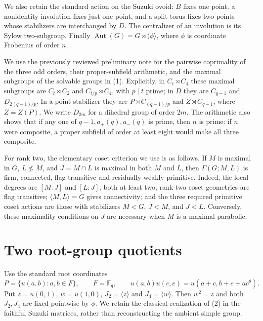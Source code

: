 \documentclass[11pt,a4paper]{article}
\newcommand{\F}{\mathbb F}
\newcommand{\gen}[1]{\langle #1\rangle}
\newcommand{\Aut}{\operatorname{Aut}}
\begin{document}
We also retain the standard action on the Suzuki ovoid: $B$ fixes
one point, a nonidentity involution fixes just one point, and a split
torus fixes two points whose stabilizers are interchanged by $D$.
The centralizer of an involution is its Sylow two-subgroup. Finally
$\Aut(G)=G\rtimes\gen{\phi}$, where $\phi$ is coordinate Frobenius
of order $n$.

We use the previously reviewed preliminary note for the pairwise
coprimality of the three odd orders, their proper-subfield arithmetic,
and the maximal subgroups of the solvable groups in (1). Explicitly,
in $C_t\rtimes C_4$ these maximal subgroups are
$C_t\rtimes C_2$ and $C_{t/p}\rtimes C_4$, with $p\mid t$ prime;
in $D$ they are $C_{q-1}$ and $D_{2(q-1)/p}$. In a point
stabilizer they are $P\rtimes C_{(q-1)/p}$ and $Z\rtimes C_{q-1}$,
where $Z=Z(P)$. We write $D_{2m}$ for a dihedral group of order $2m$.
The arithmetic also shows that if any one of $q-1,a_+(q),a_-(q)$
is prime, then $n$ is prime: if $n$ were composite, a proper
subfield of order at least eight would make all three composite.

For rank two, the elementary coset criterion we use is as follows.
If $M$ is maximal in $G$, $L\nleq M$, and $J=M\cap L$ is maximal
in both $M$ and $L$, then $\Gamma(G;M,L)$ is firm, connected,
flag transitive and residually weakly primitive. Indeed, the local
degrees are $[M:J]$ and $[L:J]$, both at least two; rank-two coset
geometries are flag transitive; $\gen{M,L}=G$ gives connectivity;
and the three required primitive coset actions are those with
stabilizers $M<G$, $J<M$, and $J<L$. Conversely, these maximality
conditions on $J$ are necessary when $M$ is a maximal parabolic.

\section{Two root-group quotients}
Use the standard root coordinates
\[
 P=\{u(a,b):a,b\in F\},\qquad F=\F_q,
 \qquad u(a,b)u(c,e)=u(a+c,b+e+ac^\theta).
                                                        \tag{2}
\]
Put $z=u(0,1)$, $w=u(1,0)$, $J_2=\gen z$ and $J_4=\gen w$.
Then $w^2=z$ and both $J_2,J_4$ are fixed pointwise by $\phi$.
We retain the classical realization of (2) in the faithful Suzuki
matrices, rather than reconstructing the ambient simple group.
\end{document}

